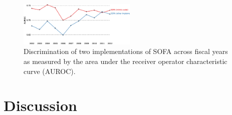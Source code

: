 \documentclass{elsart}
\begin{document}




\begin{figure}[!tpb]%
\centerline{\includegraphics[width=0.5\textwidth]{figures/SOFA.eps}}
\caption{Discrimination of two implementations of SOFA across fiscal years as measured by the area under the receiver operator characteristic curve (AUROC).}\label{fig:SevScoresOverTime}
\end{figure}

\section{Discussion}

\end{document}
